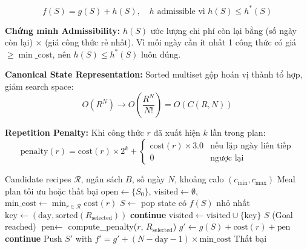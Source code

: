 \begin{equation}
f(S) = g(S) + h(S), \quad h \text{ admissible vì } h(S) \leq h^*(S)
\end{equation}

\textbf{Chứng minh Admissibility:} $h(S)$ ước lượng chi phí còn lại bằng (số ngày còn lại) $\times$ (giá công thức rẻ nhất). Vì mỗi ngày cần ít nhất 1 công thức có giá $\geq \min\_\text{cost}$, nên $h(S) \leq h^*(S)$ luôn đúng.

\textbf{Canonical State Representation:} Sorted multiset gộp hoán vị thành tổ hợp, giảm search space:
\begin{equation}
O(R^N) \rightarrow O\left(\frac{R^N}{N!}\right) = O(C(R,N))
\end{equation}

\textbf{Repetition Penalty:} Khi công thức $r$ đã xuất hiện $k$ lần trong plan:
\begin{equation}
\text{penalty}(r) = \text{cost}(r) \times 2^k + \begin{cases} \text{cost}(r) \times 3.0 & \text{nếu lặp ngày liên tiếp} \\ 0 & \text{ngược lại} \end{cases}
\end{equation}

\begin{algorithm}[H]
\caption{A* Search cho N-Days Meal Planning}
\begin{algorithmic}[1]
\REQUIRE Candidate recipes $\mathcal{R}$, ngân sách $B$, số ngày $N$, khoảng calo $(c_{\min}, c_{\max})$
\ENSURE Meal plan tối ưu hoặc thất bại
\STATE $\text{open} \leftarrow \{ S_0 \}$, $\text{visited} \leftarrow \emptyset$, $\text{min\_cost} \leftarrow \min_{r \in \mathcal{R}} \text{cost}(r)$
    \STATE $S \leftarrow$ pop state có $f(S)$ nhỏ nhất
    \STATE $\text{key} \leftarrow (\text{day}, \text{sorted}(R_{\text{selected}}))$ 
     \textbf{continue} \ENDIF
    \STATE $\text{visited} \leftarrow \text{visited} \cup \{\text{key}\}$
        \RETURN $S$ (Goal reached)
    \ENDIF
        \STATE $\text{pen} \leftarrow$ compute\_penalty($r$, $R_{\text{selected}}$)
        \STATE $g' \leftarrow g(S) + \text{cost}(r) + \text{pen}$
         \textbf{continue} \ENDIF {}
        \STATE Push $S'$ with $f' = g' + (N - \text{day} - 1) \times \text{min\_cost}$
    \ENDFOR
\ENDWHILE
\RETURN Thất bại
\end{algorithmic}
\end{algorithm}

